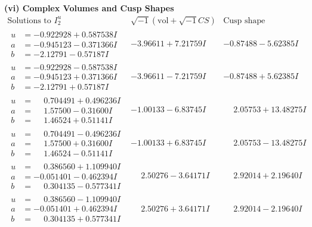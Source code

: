 \documentclass[1p]{elsarticle_modified}
\theoremstyle{definition}
\newcommand{\I}{\sqrt{-1}}
\begin{document}
\newpage\flushleft \textbf{(vi) Complex Volumes and Cusp Shapes}
$$\begin{array}{c|c|c}  
\text{Solutions to }I^u_{2}& \I (\text{vol} + \sqrt{-1}CS) & \text{Cusp shape}\\
 \hline 
\begin{aligned}
u &= -0.922928 + 0.587538 I \\
a &= -0.945123 - 0.371366 I \\
b &= -2.12791 - 0.57187 I\end{aligned}
 & -3.96611 + 7.21759 I & -0.87488 - 5.62385 I \\ \hline\begin{aligned}
u &= -0.922928 - 0.587538 I \\
a &= -0.945123 + 0.371366 I \\
b &= -2.12791 + 0.57187 I\end{aligned}
 & -3.96611 - 7.21759 I & -0.87488 + 5.62385 I \\ \hline\begin{aligned}
u &= \phantom{-}0.704491 + 0.496236 I \\
a &= \phantom{-}1.57500 - 0.31600 I \\
b &= \phantom{-}1.46524 + 0.51141 I\end{aligned}
 & -1.00133 - 6.83745 I & \phantom{-}2.05753 + 13.48275 I \\ \hline\begin{aligned}
u &= \phantom{-}0.704491 - 0.496236 I \\
a &= \phantom{-}1.57500 + 0.31600 I \\
b &= \phantom{-}1.46524 - 0.51141 I\end{aligned}
 & -1.00133 + 6.83745 I & \phantom{-}2.05753 - 13.48275 I \\ \hline\begin{aligned}
u &= \phantom{-}0.386560 + 1.109940 I \\
a &= -0.051401 - 0.462394 I \\
b &= \phantom{-}0.304135 - 0.577341 I\end{aligned}
 & \phantom{-}2.50276 - 3.64171 I & \phantom{-}2.92014 + 2.19640 I \\ \hline\begin{aligned}
u &= \phantom{-}0.386560 - 1.109940 I \\
a &= -0.051401 + 0.462394 I \\
b &= \phantom{-}0.304135 + 0.577341 I\end{aligned}
 & \phantom{-}2.50276 + 3.64171 I & \phantom{-}2.92014 - 2.19640 I \\ \hline\begin{aligned}

\end{aligned}
\end{array}$$
\end{document}

